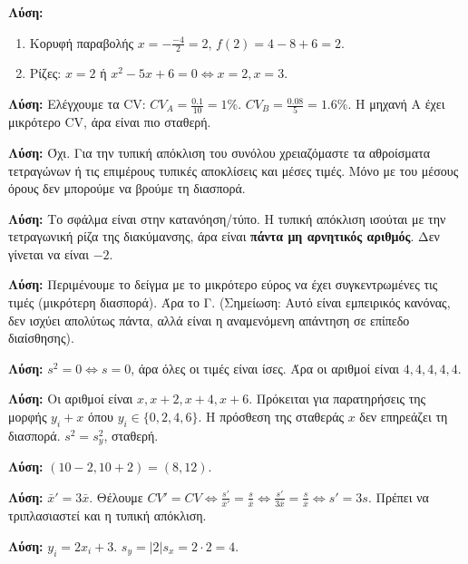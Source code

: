 \documentclass[11pt,a4paper,modern]{FFExercises}
\begin{document}
\askhsh
\textbf{Λύση:}
\begin{enumerate}
    \item Κορυφή παραβολής $x = -\frac{-4}{2} = 2$, $f(2) = 4-8+6=2$.
    \item Ρίζες: $x=2$ ή $x^2-5x+6=0 \Leftrightarrow x=2, x=3$.
\end{enumerate}

\askhsh
\textbf{Λύση:}
Ελέγχουμε τα CV:
$CV_A = \frac{0.1}{10} = 1\%$.
$CV_B = \frac{0.08}{5} = 1.6\%$.
Η μηχανή Α έχει μικρότερο CV, άρα είναι πιο σταθερή.

\askhsh
\textbf{Λύση:}
Όχι. Για την τυπική απόκλιση του συνόλου χρειαζόμαστε τα αθροίσματα τετραγώνων ή τις επιμέρους τυπικές αποκλίσεις και μέσες τιμές. Μόνο με του μέσους όρους δεν μπορούμε να βρούμε τη διασπορά.

\askhsh
\textbf{Λύση:}
Το σφάλμα είναι στην κατανόηση/τύπο. Η τυπική απόκλιση ισούται με την τετραγωνική ρίζα της διακύμανσης, άρα είναι \textbf{πάντα μη αρνητικός αριθμός}. Δεν γίνεται να είναι $-2$.

\askhsh
\textbf{Λύση:}
Περιμένουμε το δείγμα με το μικρότερο εύρος να έχει συγκεντρωμένες τις τιμές (μικρότερη διασπορά). Άρα το Γ. (Σημείωση: Αυτό είναι εμπειρικός κανόνας, δεν ισχύει απολύτως πάντα, αλλά είναι η αναμενόμενη απάντηση σε επίπεδο διαίσθησης).

\askhsh
\textbf{Λύση:}
$s^2=0 \Leftrightarrow s=0$, άρα όλες οι τιμές είναι ίσες.
Άρα οι αριθμοί είναι $4, 4, 4, 4, 4$.

\askhsh
\textbf{Λύση:}
Οι αριθμοί είναι $x, x+2, x+4, x+6$.
Πρόκειται για παρατηρήσεις της μορφής $y_i + x$ όπου $y_i \in \{0, 2, 4, 6\}$.
Η πρόσθεση της σταθεράς $x$ δεν επηρεάζει τη διασπορά.
$s^2 = s_y^2$, σταθερή.

\askhsh
\textbf{Λύση:}
$(10-2, 10+2) = (8, 12)$.

\askhsh
\textbf{Λύση:}
$\bar{x}' = 3\bar{x}$.
Θέλουμε $CV' = CV \Leftrightarrow \frac{s'}{\bar{x}'} = \frac{s}{\bar{x}} \Leftrightarrow \frac{s'}{3\bar{x}} = \frac{s}{\bar{x}} \Leftrightarrow s' = 3s$.
Πρέπει να τριπλασιαστεί και η τυπική απόκλιση.

\askhsh
\textbf{Λύση:}
$y_i = 2x_i + 3$.
$s_y = |2| s_x = 2 \cdot 2 = 4$.
\end{document}
